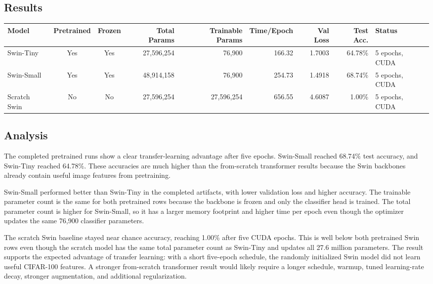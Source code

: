\documentclass[11pt]{article}
\begin{document}
\subsection*{Results}
\begin{center}
\tiny
\begin{tabular}{|p{0.85in}|c|c|r|r|r|r|r|p{0.85in}|}
\hline
Model & Pretrained & Frozen & Total Params & Trainable Params & Time/Epoch & Val Loss & Test Acc. & Status \\
\hline
Swin-Tiny & Yes & Yes & 27,596,254 & 76,900 & 166.32 & 1.7003 & 64.78\% & 5 epochs, CUDA \\
\hline
Swin-Small & Yes & Yes & 48,914,158 & 76,900 & 254.73 & 1.4918 & 68.74\% & 5 epochs, CUDA \\
\hline
Scratch Swin & No & No & 27,596,254 & 27,596,254 & 656.55 & 4.6087 & 1.00\% & 5 epochs, CUDA \\
\hline
\end{tabular}
\end{center}

\subsection*{Analysis}
The completed pretrained runs show a clear transfer-learning advantage after five epochs. Swin-Small reached 68.74\% test accuracy, and Swin-Tiny reached 64.78\%. These accuracies are much higher than the from-scratch transformer results because the Swin backbones already contain useful image features from pretraining.

Swin-Small performed better than Swin-Tiny in the completed artifacts, with lower validation loss and higher accuracy. The trainable parameter count is the same for both pretrained rows because the backbone is frozen and only the classifier head is trained. The total parameter count is higher for Swin-Small, so it has a larger memory footprint and higher time per epoch even though the optimizer updates the same 76,900 classifier parameters.

The scratch Swin baseline stayed near chance accuracy, reaching 1.00\% after five CUDA epochs. This is well below both pretrained Swin rows even though the scratch model has the same total parameter count as Swin-Tiny and updates all 27.6 million parameters. The result supports the expected advantage of transfer learning: with a short five-epoch schedule, the randomly initialized Swin model did not learn useful CIFAR-100 features. A stronger from-scratch transformer result would likely require a longer schedule, warmup, tuned learning-rate decay, stronger augmentation, and additional regularization.
\end{document}
